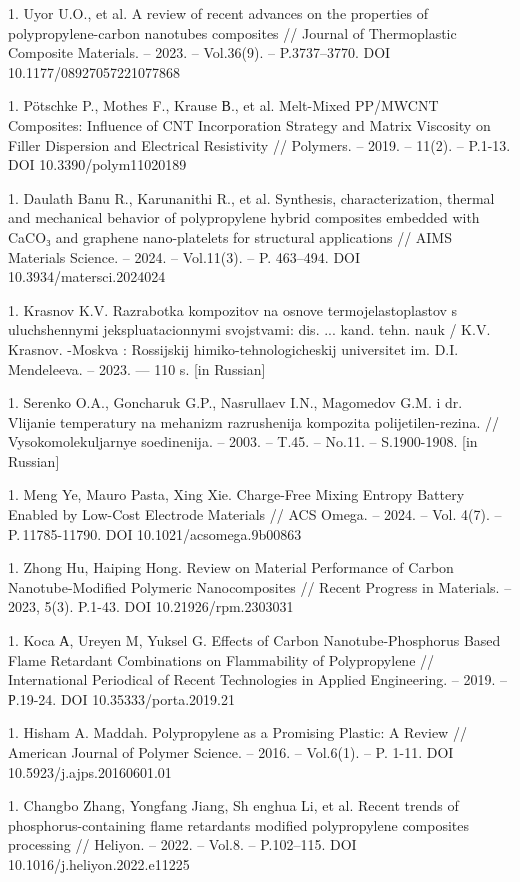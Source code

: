 1. Uyor U.O., et al. A review of recent advances on the properties of
polypropylene-carbon nanotubes composites // Journal of Thermoplastic
Composite Materials. -- 2023. -- Vol.36(9). -- P.3737--3770. DOI
10.1177/08927057221077868

1. Pötschke P., Mothes F., Krause В., et al. Melt-Mixed PP/MWCNT
Composites: Influence of CNT Incorporation Strategy and Matrix
Viscosity on Filler Dispersion and Electrical Resistivity // Polymers.
-- 2019. -- 11(2). -- P.1-13. DOI 10.3390/polym11020189

1. Daulath Banu R., Karunanithi R., et al. Synthesis, characterization,
thermal and mechanical behavior of polypropylene hybrid composites
embedded with CaCO₃ and graphene nano-platelets for structural
applications // AIMS Materials Science. -- 2024. -- Vol.11(3). -- P.
463--494. DOI 10.3934/matersci.2024024

1. Krasnov K.V. Razrabotka kompozitov na osnove termojelastoplastov s
uluchshennymi jekspluatacionnymi svojstvami: dis. ... kand. tehn. nauk
/ K.V. Krasnov. -Moskva : Rossijskij himiko-tehnologicheskij
universitet im. D.I. Mendeleeva. -- 2023. --- 110 s. {[}in Russian{]}

1. Serenko O.A., Goncharuk G.P., Nasrullaev I.N., Magomedov G.M. i dr.
Vlijanie temperatury na mehanizm razrushenija kompozita
polijetilen-rezina. // Vysokomolekuljarnye soedinenija. -- 2003. --
T.45. -- No.11. -- S.1900-1908. {[}in Russian{]}

1. Meng Ye, Mauro Pasta, Xing Xie. Charge-Free Mixing Entropy Battery
Enabled by Low-Cost Electrode Materials // ACS Omega. -- 2024. -- Vol.
4(7). -- P.\,11785-11790. DOI 10.1021/acsomega.9b00863

1. Zhong Hu, Haiping Hong. Review on Material Performance of Carbon
Nanotube-Modified Polymeric Nanocomposites // Recent Progress in
Materials. -- 2023, 5(3). P.1-43. DOI 10.21926/rpm.2303031

1. Koca А, Ureyen M, Yuksel G. Effects of Carbon Nanotube-Phosphorus
Based Flame Retardant Combinations on Flammability of Polypropylene //
International Periodical of Recent Technologies in Applied
Engineering. -- 2019. -- Р.19-24. DOI 10.35333/porta.2019.21

1. Hisham A. Maddah. Polypropylene as a Promising Plastic: A Review //
American Journal of Polymer Science. -- 2016. -- Vol.6(1). -- P.
1-11. DOI 10.5923/j.ajps.20160601.01

1. Changbo Zhang, Yongfang Jiang, Sh enghua Li, et al. Recent trends of
phosphorus-containing flame retardants modified polypropylene
composites processing // Heliyon. -- 2022. -- Vol.8. -- P.102--115.
DOI 10.1016/j.heliyon.2022.e11225

